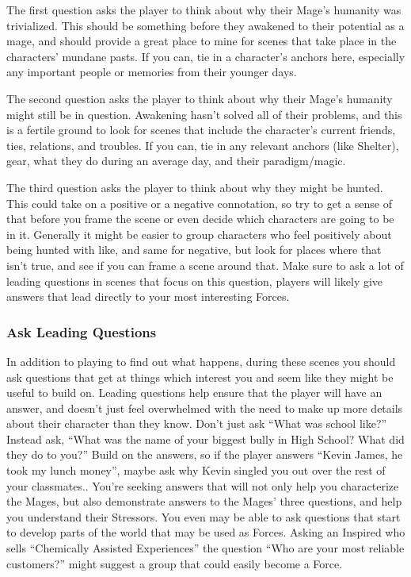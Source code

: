 \documentclass[
]{article}
\begin{document}
The first question asks the player to think about why their Mage's
humanity was trivialized. This should be something before they awakened
to their potential as a mage, and should provide a great place to mine
for scenes that take place in the characters' mundane pasts. If you can,
tie in a character's anchors here, especially any important people or
memories from their younger days.

The second question asks the player to think about why their Mage's
humanity might still be in question. Awakening hasn't solved all of
their problems, and this is a fertile ground to look for scenes that
include the character's current friends, ties, relations, and troubles.
If you can, tie in any relevant anchors (like Shelter), gear, what they
do during an average day, and their paradigm/magic.

The third question asks the player to think about why they might be
hunted. This could take on a positive or a negative connotation, so try
to get a sense of that before you frame the scene or even decide which
characters are going to be in it. Generally it might be easier to group
characters who feel positively about being hunted with like, and same
for negative, but look for places where that isn't true, and see if you
can frame a scene around that. Make sure to ask a lot of leading
questions in scenes that focus on this question, players will likely
give answers that lead directly to your most interesting Forces.

\hypertarget{ask-leading-questions}{%
\subsubsection{Ask Leading Questions}\label{ask-leading-questions}}

In addition to playing to find out what happens, during these scenes you
should ask questions that get at things which interest you and seem like
they might be useful to build on. Leading questions help ensure that the
player will have an answer, and doesn't just feel overwhelmed with the
need to make up more details about their character than they know. Don't
just ask ``What was school like?'' Instead ask, ``What was the name of
your biggest bully in High School? What did they do to you?'' Build on
the answers, so if the player answers ``Kevin James, he took my lunch
money'', maybe ask why Kevin singled you out over the rest of your
classmates.. You're seeking answers that will not only help you
characterize the Mages, but also demonstrate answers to the Mages' three
questions, and help you understand their Stressors. You even may be able
to ask questions that start to develop parts of the world that may be
used as Forces. Asking an Inspired who sells ``Chemically Assisted
Experiences'' the question ``Who are your most reliable customers?''
might suggest a group that could easily become a Force.
\end{document}
